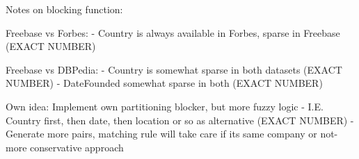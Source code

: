 Notes on blocking function:

Freebase vs Forbes: 
- Country is always available in Forbes, sparse in Freebase (EXACT NUMBER)

Freebase vs DBPedia:
- Country is somewhat sparse in both datasets (EXACT NUMBER)
- DateFounded somewhat sparse in both (EXACT NUMBER)

Own idea: Implement own partitioning blocker, but more fuzzy logic
- I.E. Country first, then date, then location or so as alternative (EXACT NUMBER)
- Generate more pairs, matching rule will take care if its same company or not- more conservative approach